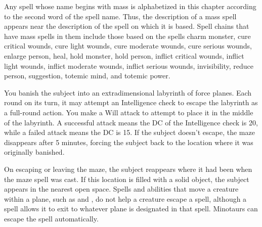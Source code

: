 \par Any spell whose name begins with mass is alphabetized in this chapter according to the second word of the spell name. Thus, the description of a mass spell appears near the description of the spell on which it is based. Spell chains that have mass spells in them include those based on the spells charm monster, cure critical wounds, cure light wounds, cure moderate wounds, cure serious wounds, enlarge person, heal, hold monster, hold person, inflict critical wounds, inflict light wounds, inflict moderate wounds, inflict serious wounds, invisibility, reduce person, suggestion, totemic mind, and totemic power.

\spelleffect You banish the subject into an extradimensional labyrinth of force planes. Each round on its turn, it may attempt an Intelligence check to escape the labyrinth as a full-round action. You make a Will attack to attempt to place it in the middle of the labyrinth. A successful attack means the DC of the Intelligence check is 20, while a failed attack means the DC is 15. If the subject doesn't escape, the maze disappears after 5 minutes, forcing the subject back to the location where it was originally banished.
\par On escaping or leaving the maze, the subject reappears where it had been when the maze spell was cast. If this location is filled with a solid object, the subject appears in the nearest open space.
\spellnotes Spells and abilities that move a creature within a plane, such as  and , do not help a creature escape a  spell, although a  spell allows it to exit to whatever plane is designated in that spell. Minotaurs can escape the spell automatically.


